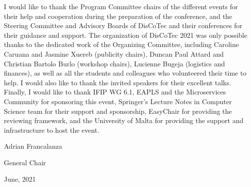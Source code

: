 \documentclass[10pt]{article}
\begin{document}
I would like to thank the Program Committee chairs of the different events for their help and cooperation during the preparation of the conference, and the Steering Committee and Advisory Boards of DisCoTec and their conferences for their guidance and support. 
%
The organization of DisCoTec 2021 was only possible thanks to the dedicated work of the Organizing Committee, including Caroline Caruana and Jasmine Xuereb (publicity chairs),  Duncan Paul Attard and Christian Bartolo Burlo  (workshop chairs), Lucienne Bugeja (logistics and finances), as well as all the students and colleagues who volunteered their time to help. 
%
I would also like to thank the invited speakers for their excellent talks.
%
Finally, I would like to thank IFIP WG 6.1, EAPLS and the Microservices Community for sponsoring this event, Springer’s Lecture Notes in Computer Science team for their support and sponsorship, EasyChair for providing the reviewing framework, and the University of Malta for providing the support and infrastructure to host the event.

\vspace{0.6cm}
\noindent 
Adrian Francalanza

\noindent
General Chair

\noindent
June, 2021
\end{document}
